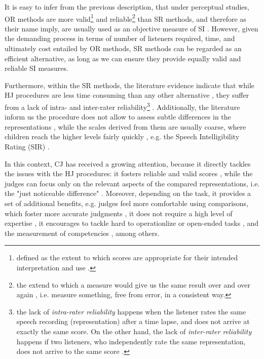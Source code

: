 It is easy to infer from the previous description, that under perceptual studies, OR methods are more valid\footnote{defined as the extent to which scores are appropriate for their intended interpretation and use \citep{Lesterhuis_2018, Trochim_2022}.} and reliable\footnote{the extend to which a measure would give us the same result over and over again \citep{Trochim_2022}, i.e. measure something, free from error, in a consistent way.} than SR methods, and therefore as their name imply, are usually used as an objective measure of SI \citep{Boonen_et_al_2021, Faes_et_al_2021}. However, given the demanding process in terms of number of listeners required, time, and ultimately cost entailed by OR methods, SR methods can be regarded as an efficient alternative, as long as we can ensure they provide equally valid and reliable SI measures.

Furthermore, within the SR methods, the literature evidence indicate that while HJ procedures are less time consuming than any other alternative \citep{Boonen_et_al_2021}, they suffer from a lack of intra- and inter-rater reliability\footnote{the lack of \textit{intra-rater reliability} happens when the listener rates the same speech recording (representation) after a time lapse, and does not arrive at exactly the same score. On the other hand, the lack of \textit{inter-rater reliability} happens if two listeners, who independently rate the same representation, does not arrive to the same score \citep{Trochim_2022}.} \citep{McLeod_et_al_2012, Johannisson_et_al_2014, Hustad_et_al_2020, Boonen_et_al_2021}. Additionally, the literature inform us the procedure does not allow to assess subtle differences in the representations \citep{Boonen_et_al_2021}, while the scales derived from them are usually coarse, where children reach the higher levels fairly quickly \citep{DeRaeve_2010}, e.g. the Speech Intelligibility Rating (SIR) \citep{Cox_et_al_1989, McDaniel_et_al_1992}.

In this context, CJ has received a growing attention, because it directly tackles the issues with the HJ procedures: it fosters reliable \citep{Verhavert_et_al_2019} and valid scores \citep{Bramley_2008, Lesterhuis_2018}, while the judges can focus only on the relevant aspects of the compared representations, i.e. the "just noticeable difference" \citep{Lesterhuis_2018}. Moreover, depending on the task, it provides a set of additional benefits, e.g. judges feel more comfortable using comparisons, which foster more accurate judgments \citep{Gill_et_al_2013}, it does not require a high level of expertise \citep{Lesterhuis_2018, Boonen_et_al_2020}, it encourages to tackle hard to operationlize or open-ended tasks \citep{Pollitt_2012a, Pollitt_2012b, Lesterhuis_2018}, and the measurement of competencies \citep{Verhavert_2018}, among others.
